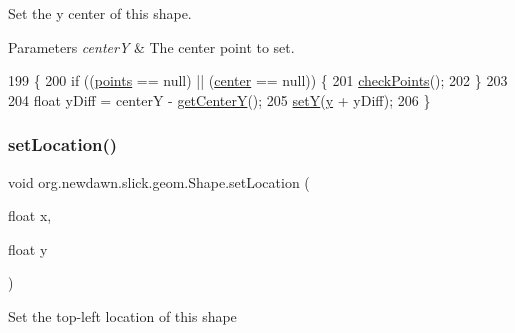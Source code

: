 Set the y center of this shape.


\begin{DoxyParams}{Parameters}
{\em centerY} & The center point to set. \\
\hline
\end{DoxyParams}

\begin{DoxyCode}
199                                           \{
200         \textcolor{keywordflow}{if} ((\mbox{\hyperlink{classorg_1_1newdawn_1_1slick_1_1geom_1_1_shape_a8b4d4058734bbb3b96072e470b92aa37}{points}} == null) || (\mbox{\hyperlink{classorg_1_1newdawn_1_1slick_1_1geom_1_1_shape_a15ecde3336c4310cd927d766bb9a0b3b}{center}} == null)) \{
201             \mbox{\hyperlink{classorg_1_1newdawn_1_1slick_1_1geom_1_1_shape_a84293802d05e8666a441720bfc12745d}{checkPoints}}();
202         \}
203         
204         \textcolor{keywordtype}{float} yDiff = centerY - \mbox{\hyperlink{classorg_1_1newdawn_1_1slick_1_1geom_1_1_shape_a9937c71e414375a9974c7a5d8fcc06e5}{getCenterY}}();
205         \mbox{\hyperlink{classorg_1_1newdawn_1_1slick_1_1geom_1_1_shape_a7a127d0dea9bd7f0e3ce3fd0a61268fc}{setY}}(\mbox{\hyperlink{classorg_1_1newdawn_1_1slick_1_1geom_1_1_shape_a9f934baded6a1b65ebb69e7e5f80ea00}{y}} + yDiff);
206     \}
\end{DoxyCode}
\mbox{\label{classorg_1_1newdawn_1_1slick_1_1geom_1_1_shape_a8dde2a46d3b696843e530545c0935a97}} 
\subsubsection{\texorpdfstring{set\+Location()}{setLocation()}\hspace{0.1cm}{\footnotesize\ttfamily [1/2]}}
{\footnotesize\ttfamily void org.\+newdawn.\+slick.\+geom.\+Shape.\+set\+Location (\begin{DoxyParamCaption}\item[{float}]{x,  }\item[{float}]{y }\end{DoxyParamCaption})\hspace{0.3cm}{\ttfamily [inline]}}

Set the top-\/left location of this shape


